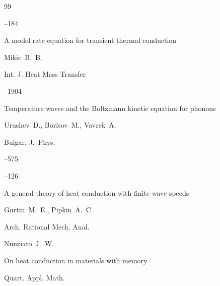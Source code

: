 \begin{thebibliography}{99}



--184






\paper A model rate equation for transient thermal conduction

\by   Mikic~B.~B.

\jour Int. J. Heat Mass Transfer




--1904






\paper 	Temperature waves and the Boltzmann kinetic equation for phonons

\by 	Urushev~D., Borisov~M., Vavrek~A.

\jour 	Bulgar. J.~Phys.




--575







–126

\paper A general theory of heat conduction with finite wave speeds

\by  Gurtin~M.~E., Pipkin~A.~C.


\jour Arch. Rational Mech. Anal. 






\by  Nunziato~J.~W.

\paper On heat conduction in materials with memory 

\jour Quart. Appl. Math. 




\end{thebibliography}
